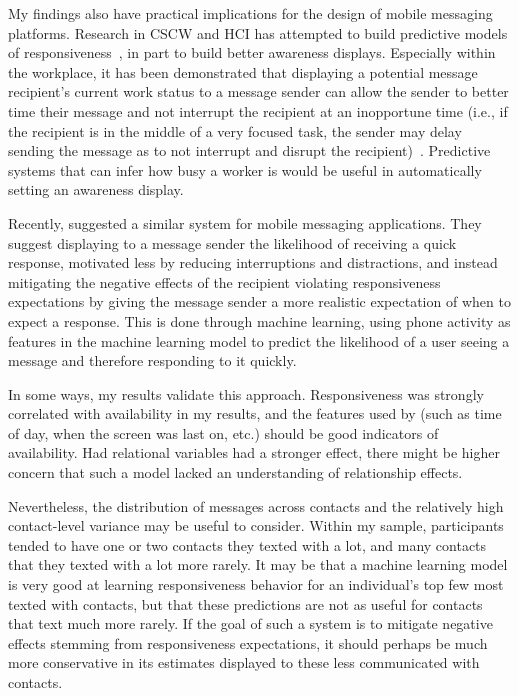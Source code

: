 \documentclass[12pt]{nuthesis}	%
\begin{document}
My findings also have practical implications for the design of mobile messaging platforms. Research in CSCW and HCI has attempted to build predictive models of responsiveness~\citep[e.g.,][]{avrahami2007improving,avrahami2008waiting,dabbish2005understanding}, in part to build better awareness displays. Especially within the workplace, it has been demonstrated that displaying a potential message recipient's current work status to a message sender can allow the sender to better time their message and not interrupt the recipient at an inopportune time (i.e., if the recipient is in the middle of a very focused task, the sender may delay sending the message as to not interrupt and disrupt the recipient)~\citep{dabbish2004awareness}. Predictive systems that can infer how busy a worker is would be useful in automatically setting an awareness display.

Recently, \citet{pielot2014didn} suggested a similar system for mobile messaging applications. They suggest displaying to a message sender the likelihood of receiving a quick response, motivated less by reducing interruptions and distractions, and instead mitigating the negative effects of the recipient violating responsiveness expectations by giving the message sender a more realistic expectation of when to expect a response. This is done through machine learning, using phone activity as features in the machine learning model to predict the likelihood of a user seeing a message and therefore responding to it quickly.

In some ways, my results validate this approach. Responsiveness was strongly correlated with availability in my results, and the features used by \citet{pielot2014didn} (such as time of day, when the screen was last on, etc.) should be good indicators of availability. Had relational variables had a stronger effect, there might be higher concern that such a model lacked an understanding of relationship effects.

Nevertheless, the distribution of messages across contacts and the relatively high contact-level variance may be useful to consider. Within my sample, participants tended to have one or two contacts they texted with a lot, and many contacts that they texted with a lot more rarely. It may be that a machine learning model is very good at learning responsiveness behavior for an individual's top few most texted with contacts, but that these predictions are not as useful for contacts that text much more rarely. If the goal of such a system is to mitigate negative effects stemming from responsiveness expectations, it should perhaps be much more conservative in its estimates displayed to these less communicated with contacts.
\end{document}
